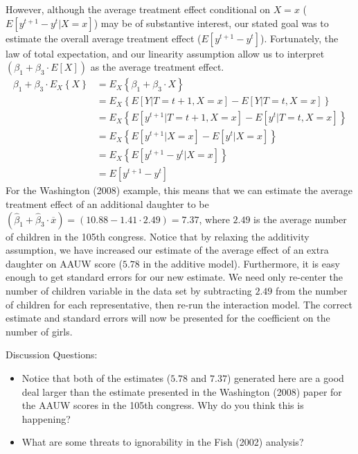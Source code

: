 \documentclass{article}
\begin{document}
However, although the average treatment effect conditional on $X=x$ ($E[y^{t+1}-y^{t}|X=x]$) may be of substantive interest, our stated goal was to estimate the overall average treatment effect ($E[y^{t+1}-y^{t}]$). Fortunately, the law of total expectation, and our linearity assumption allow us to interpret $(\beta_1 + \beta_3 \cdot E[X])$ as the average treatment effect. 
\begin{align*}
\beta_1 + \beta_3 \cdot E_X\left\{X \right\} &= E_X\left\{\beta_1 + \beta_3 \cdot X \right\} \\
&= E_X\left\{E[Y|T=t+1,X=x]-E[Y|T=t,X=x]\right\}\\
&= E_X\left\{E[y^{t+1}|T=t+1,X=x]-E[y^{t}|T=t,X=x]\right\} \\
&= E_X\left\{E[y^{t+1}|X=x]-E[y^{t}|X=x]\right\}\\
&= E_X\left\{E[y^{t+1}-y^{t}|X=x]\right\} \\
&= E[y^{t+1}-y^{t}] 
\end{align*}
For the Washington (2008) example, this means that we can estimate the average treatment effect of an additional daughter to be $(\widehat{\beta}_1 + \widehat{\beta}_3 \cdot \overline{x}) =  (10.88 - 1.41 \cdot 2.49) = 7.37$, where $2.49$ is the average number of children in the 105th congress. Notice that by relaxing the additivity assumption, we have increased our estimate of the average effect of an extra daughter on AAUW score ($5.78$ in the additive model). Furthermore, it is easy enough to get standard errors for our new estimate. We need only re-center the number of children variable in the data set by subtracting $2.49$ from the number of children for each representative, then re-run the interaction model. The correct estimate and standard errors will now be presented for the coefficient on the number of girls. \\

\single

\noindent Discussion Questions:
\begin{itemize}
\item Notice that both of the estimates ($5.78$ and $7.37$) generated here are a good deal larger than the estimate presented in the Washington (2008) paper for the AAUW scores in the 105th congress. Why do you think this is happening?
\item What are some threats to ignorability in the Fish (2002) analysis?
\end{itemize}
\end{document}
